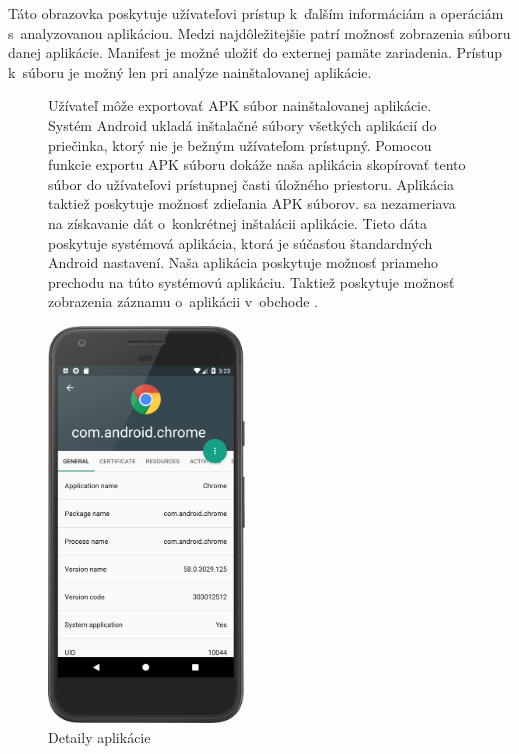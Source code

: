 Táto obrazovka poskytuje užívateľovi prístup k~ďalším informáciám a operáciám s~analyzovanou aplikáciou. Medzi najdôležitejšie patrí možnosť zobrazenia súboru  danej aplikácie. Manifest je možné uložiť do externej pamäte zariadenia. Prístup k~súboru  je možný len pri analýze nainštalovanej aplikácie.
\begin{figure}[H]
\begin{minipage}[t]{0.48\textwidth}
Užívateľ môže exportovať APK súbor nainštalovanej aplikácie. Systém Android ukladá inštalačné súbory všetkých aplikácií do priečinka, ktorý nie je bežným užívateľom prístupný. Pomocou funkcie exportu APK súboru dokáže naša aplikácia skopírovať tento súbor do užívateľovi prístupnej časti úložného priestoru. Aplikácia taktiež poskytuje možnosť zdieľania APK súborov. 
 sa nezameriava na získavanie dát o~konkrétnej inštalácii aplikácie. Tieto dáta poskytuje systémová aplikácia, ktorá je súčasťou štandardných Android nastavení. Naša aplikácia poskytuje možnosť priameho prechodu na túto systémovú aplikáciu.  Taktiež poskytuje možnosť zobrazenia záznamu o~aplikácii v~obchode .
\end{minipage}%
\hfill
\centering
\begin{minipage}[t][][b]{0.45\textwidth}
\centering
    \includegraphics[width=5.2cm]{images/app/detail_device.png}
\centering
\caption{Detaily aplikácie}
\label{fig:app-detail}
\end{minipage}%
\end{figure}


